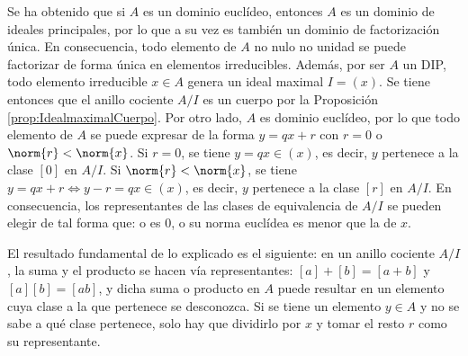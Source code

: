 \begin{obs}
    Se ha obtenido que si $A$ es un dominio euclídeo, entonces $A$ es un dominio de ideales principales, por lo que a su vez es también un dominio de factorización única. En consecuencia, todo elemento de $A$ no nulo no unidad se puede factorizar de forma única en elementos irreducibles. Además, por ser $A$ un DIP, todo elemento irreducible $x\in A$ genera un ideal maximal $I = (x)$. Se tiene entonces que el anillo cociente $A/I$ es un cuerpo por la Proposición \ref{prop:IdealmaximalCuerpo}. Por otro lado, $A$ es dominio euclídeo, por lo que todo elemento de $A$ se puede expresar de la forma $y = qx + r$ con $r = 0 $ o $\norm{r} < \norm{x}$. Si $r = 0$, se tiene $y = qx \in (x)$, es decir, $y$ pertenece a la clase $[0]$ en $A/I$. Si $\norm{r} < \norm{x}$, se tiene $y = qx + r \iff y - r = qx \in (x)$, es decir, $y$ pertenece a la clase $[r]$ en $A/I$. En consecuencia, los representantes de las clases de equivalencia de $A/I$ se pueden elegir de tal forma que: o es 0, o su norma euclídea es menor que la de $x$.
    
    \item El resultado fundamental de lo explicado es el siguiente: en un anillo cociente $A/I$, la suma y el producto se hacen vía representantes: $[a] + [b] = [a + b]$ y $[a][b] = [ab]$, y dicha suma o producto en $A$ puede resultar en un elemento cuya clase a la que pertenece se desconozca. Si se tiene un elemento $y\in A$ y no se sabe a qué clase pertenece, solo hay que dividirlo por $x$ y tomar el resto $r$ como su representante. 
    

\end{obs}






\begin{prop}\label{prop:K_cuerpo_K[X]_DE}\end{prop}

